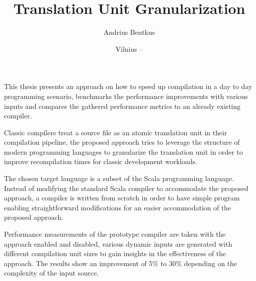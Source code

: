 \documentclass{VUMIFPSbakalaurinis}
\institute{Informatikos institutas}  %
\title{Translation Unit Granularization}
\author{Andrius Bentkus}
\date{Vilnius – \the\year}
\begin{document}
\maketitle


\addtocounter{page}{1}

This thesis presents an approach on how to speed up compilation in a day to day programming scenario, benchmarks the performance improvements with various inputs and compares the gathered performance metrics to an already existing compiler.

Classic compilers treat a source file as an atomic translation unit in their compilation pipeline, the proposed approach tries to leverage the structure of modern programming languages to granularize the translation unit in order to improve recompilation times for classic development workloads.

The chosen target language is a subset of the Scala programming language.
Instead of modifying the standard Scala compiler to accommodate the proposed approach, a compiler is written from scratch in order to have simple program enabling straightforward modifications for an easier accommodation of the proposed approach.

Performance measurements of the prototype compiler are taken with the approach enabled and disabled, various dynamic inputs are generated with different compilation unit sizes to gain insights in the effectiveness of the approach. The results show an improvement of 5\% to 30\% depending on the complexity of the input source.





\tableofcontents


\end{document}
